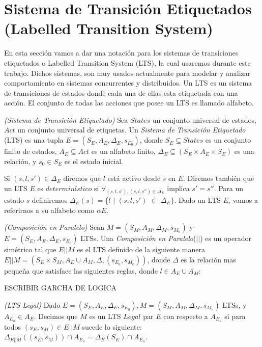 \section{Sistema de Transición Etiquetados (Labelled Transition System)}

En esta sección vamos a dar una notación para los sistemas de transiciones etiquetados o Labelled Transition System
(LTS), la cual usaremos durante este trabajo. Dichos sistemas, son muy usados actualmente para modelar y analizar
comportamiento en sistemas concurrentes y distribuidos. Un LTS es un sistema de transiciones de estados donde cada una
de ellas esta etiquetada con una acción. El conjunto de todas las acciones que posee un LTS es llamado alfabeto.

\begin{nahaDef}
    \emph{(Sistema de Transición Etiquetado)\cite{Keller:1976:FVP:360248.360251}} Sea $States$ un conjunto universal de estados, $Act$ un conjunto
    universal de etiquetas. Un \emph{Sistema de Transición Etiquetado} (LTS) es una tupla $E = (S_E,A_E,\Delta_E,s_{E_0})$,
    donde $S_E \subseteq States$ es un conjunto finito de estados, $A_E \subseteq Act$ es un alfabeto finito, $\Delta_E
    \subseteq (S_E \times A_E \times S_E)$ es una relación, y $s_0 \in S_E$ es el estado inicial.
\end{nahaDef}

Si $(s,l,s') \in \Delta_E$ diremos que $l$ está activo desde $s$ en $E$. Diremos también que un LTS $E$ es
$determinístico$ si $\forall_{(s,l,s'),(s,l,s'') \in \Delta_E}$ implica $s' = s''$. Para un estado $s$ definiremos
$\Delta_E(s) = $\{$l$ $|$ $(s,l,s')$ $\in$ $\Delta_E\}$. Dado un LTS $E$, vamos a referirnos a su alfabeto como $\alpha E$.

\begin{nahaDef}
    \emph{(Composición en Paralelo)} Sean $M = (S_M,A_M,\Delta_M, s_{M_0})$ y $E = (S_E,A_E,\Delta_E, s_{E_0})$ LTSs.
    Una \emph{Composición en Paralelo}($||$) es un operador simétrico tal que $E||M$ es el LTS definido de la siguiente
    manera $E||M = (S_E \times S_M, A_E \cup A_M, \Delta, (s_{E_0},s_{M_0}))$, donde $\Delta$ es la relación mas
    pequeña que satisface las siguientes reglas, donde $l \in A_E \cup A_M$:
\end{nahaDef}

ESCRIBIR GARCHA DE LOGICA

\begin{nahaDef}
    \emph{(LTS Legal)} Dado $E = (S_E, A_E, \Delta_E, s_{E_0}), M = (S_M, A_M, \Delta_M, s_{M_0})$ LTSs, y $A_{E_u} \in
    A_E$. Decimos que $M$ es un LTS $Legal$ par $E$ con respecto a $A_{E_u}$ si para todos $(s_E,s_M) \in E||M$ sucede
    lo siguiente: $\Delta_{E||M}((s_E,s_M)) \cap A_{E_u} = \Delta_E(S_E) \cap A_{E_u}$.
\end{nahaDef} 

